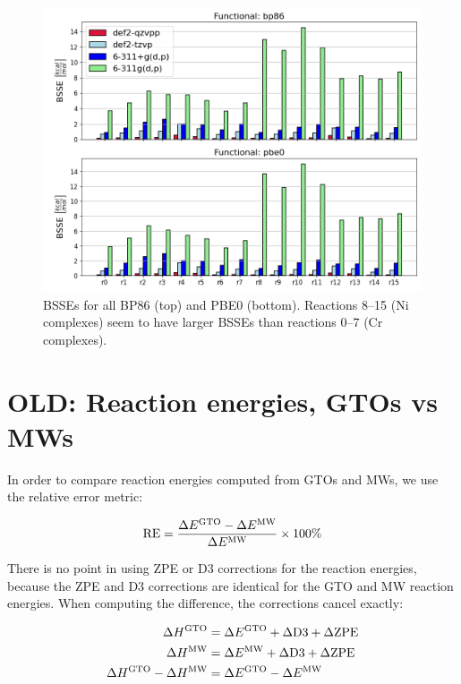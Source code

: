 \documentclass[11pt,a4paper]{article}
\begin{document}
\begin{figure}[H]
	\centering
	\includegraphics[width = \textwidth]{../figs/bsse.png}
	\caption{BSSEs for all BP86 (top) and PBE0 (bottom). Reactions 8--15 (Ni complexes) seem to have larger BSSEs than reactions 0--7 (Cr complexes).}
	\label{fig: bsse overview}
\end{figure}

\section{OLD: Reaction energies, GTOs vs MWs}
In order to compare reaction energies computed from GTOs and MWs, we use the relative error metric:

\begin{equation} \label{eq: relative error}
\text{RE} = \frac{\Delta E^{\small\text{GTO}} - \Delta E^{\small\text{MW}}}{\Delta E^{\small\text{MW}}} \times 100\%
\end{equation}

There is no point in using ZPE or D3 corrections for the reaction energies, because the ZPE and D3 corrections are identical for the GTO and MW reaction energies.
When computing the difference, the corrections cancel exactly:

\begin{align} \label{eq: }
 \Delta H^{\small\text{GTO}} &= \Delta E^{\small\text{GTO}} + \Delta \text{D3} + \Delta \text{ZPE} \\
  \Delta H^{\small\text{MW}} &= \Delta E^{\small\text{MW}} + \Delta \text{D3} + \Delta \text{ZPE} \\
  \Delta H^{\small\text{GTO}} - \Delta H^{\small\text{MW}} &= \Delta E^{\small\text{GTO}} - \Delta E^{\small\text{MW}}
\end{align}
\end{document}
